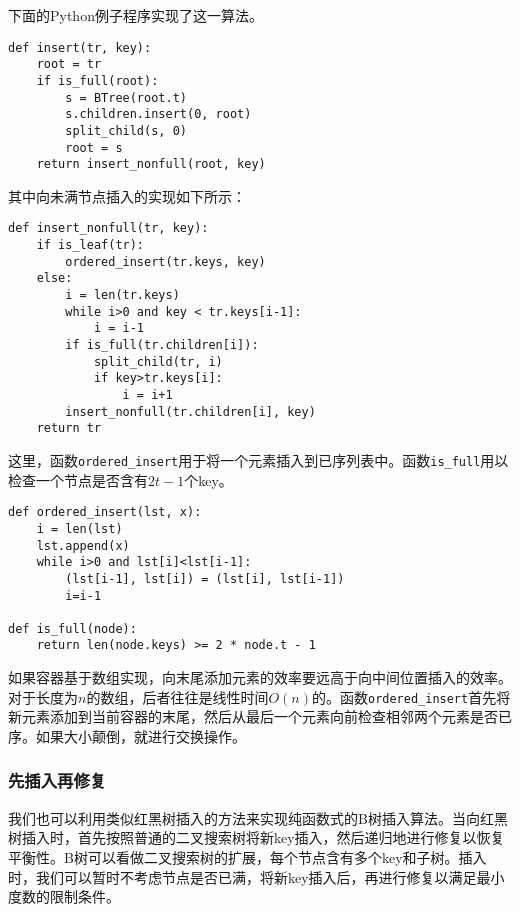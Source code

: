 \documentclass[UTF8]{article}
\begin{document}
下面的Python例子程序实现了这一算法。

\lstset{language=Python}
\begin{lstlisting}
def insert(tr, key):
    root = tr
    if is_full(root):
        s = BTree(root.t)
        s.children.insert(0, root)
        split_child(s, 0)
        root = s
    return insert_nonfull(root, key)
\end{lstlisting}

其中向未满节点插入的实现如下所示：

\begin{lstlisting}
def insert_nonfull(tr, key):
    if is_leaf(tr):
        ordered_insert(tr.keys, key)
    else:
        i = len(tr.keys)
        while i>0 and key < tr.keys[i-1]:
            i = i-1
        if is_full(tr.children[i]):
            split_child(tr, i)
            if key>tr.keys[i]:
                i = i+1
        insert_nonfull(tr.children[i], key)
    return tr
\end{lstlisting}

这里，函数\texttt{ordered\_insert}用于将一个元素插入到已序列表中。函数\texttt{is\_full}用以检查一个节点是否含有$2t-1$个key。

\begin{lstlisting}
def ordered_insert(lst, x):
    i = len(lst)
    lst.append(x)
    while i>0 and lst[i]<lst[i-1]:
        (lst[i-1], lst[i]) = (lst[i], lst[i-1])
        i=i-1

def is_full(node):
    return len(node.keys) >= 2 * node.t - 1
\end{lstlisting}

如果容器基于数组实现，向末尾添加元素的效率要远高于向中间位置插入的效率。对于长度为$n$的数组，后者往往是线性时间$O(n)$的。函数\texttt{ordered\_insert}首先将新元素添加到当前容器的末尾，然后从最后一个元素向前检查相邻两个元素是否已序。如果大小颠倒，就进行交换操作。


\subsubsection{先插入再修复}

我们也可以利用类似红黑树插入的方法来实现纯函数式的B树插入算法。当向红黑树插入时，首先按照普通的二叉搜索树将新key插入，然后递归地进行修复以恢复平衡性。B树可以看做二叉搜索树的扩展，每个节点含有多个key和子树。插入时，我们可以暂时不考虑节点是否已满，将新key插入后，再进行修复以满足最小度数的限制条件。
\end{document}
